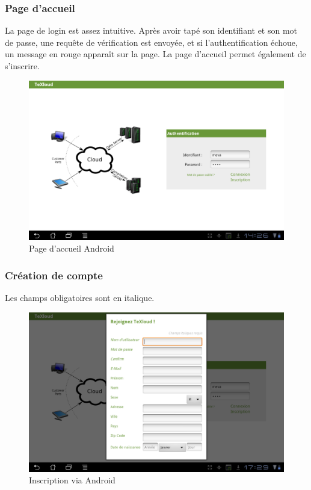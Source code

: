 \documentclass[a4paper,12pt]{article}
\begin{document}
\subsubsection{Page d'accueil}
La page de login est assez intuitive. Après avoir tapé son identifiant et son mot de passe, une requête de vérification est envoyée, et si l'authentification échoue, un message en rouge apparaît sur la page. La page d'accueil permet également de s'inscrire.
\begin{figure}[!ht]
\begin{center}
  \includegraphics[width=1\textwidth]{./images/screenshot/android_accueil.png}
\end{center}
  \caption{Page d'accueil Android}
  \label{Page d'accueil Android}
\end{figure}

\subsubsection{Création de compte}
Les champs obligatoires sont en italique.
\begin{figure}[!ht]
\begin{center}
  \includegraphics[width=1\textwidth]{./images/screenshot/inscription_android.png}
\end{center}
  \caption{Inscription via Android}
  \label{Inscription via Android}
\end{figure}
\end{document}
